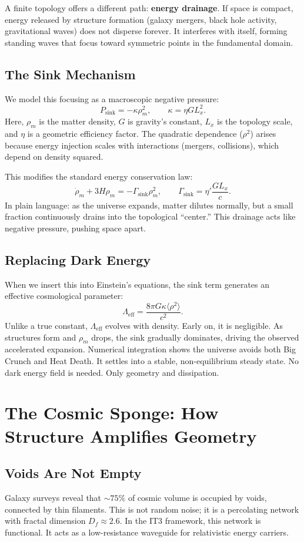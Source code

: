 \documentclass[12pt,a4paper]{report}
\begin{document}
A finite topology offers a different path: \textbf{energy drainage}. If space is compact, energy released by structure formation (galaxy mergers, black hole activity, gravitational waves) does not disperse forever. It interferes with itself, forming standing waves that focus toward symmetric points in the fundamental domain.

\section{The Sink Mechanism}
We model this focusing as a macroscopic negative pressure:
$$
P_{\text{sink}} = -\kappa \rho_m^2, \qquad \kappa = \eta G L_x^2.
$$
Here, $\rho_m$ is the matter density, $G$ is gravity's constant, $L_x$ is the topology scale, and $\eta$ is a geometric efficiency factor. The quadratic dependence ($\rho^2$) arises because energy injection scales with interactions (mergers, collisions), which depend on density squared.

This modifies the standard energy conservation law:
$$
\dot{\rho}_m + 3H\rho_m = -\Gamma_{\text{sink}}\rho_m^2, \qquad \Gamma_{\text{sink}} = \eta' \frac{G L_x}{c}.
$$
In plain language: as the universe expands, matter dilutes normally, but a small fraction continuously drains into the topological ``center.'' This drainage acts like negative pressure, pushing space apart.

\section{Replacing Dark Energy}
When we insert this into Einstein's equations, the sink term generates an effective cosmological parameter:
$$
\Lambda_{\text{eff}} = \frac{8\pi G \kappa \langle \rho^2 \rangle}{c^2}.
$$
Unlike a true constant, $\Lambda_{\text{eff}}$ evolves with density. Early on, it is negligible. As structures form and $\rho_m$ drops, the sink gradually dominates, driving the observed accelerated expansion. Numerical integration shows the universe avoids both Big Crunch and Heat Death. It settles into a stable, non-equilibrium steady state. No dark energy field is needed. Only geometry and dissipation.

\chapter{The Cosmic Sponge: How Structure Amplifies Geometry}
\section{Voids Are Not Empty}
Galaxy surveys reveal that $\sim 75\%$ of cosmic volume is occupied by voids, connected by thin filaments. This is not random noise; it is a percolating network with fractal dimension $D_f \approx 2.6$. In the IT3 framework, this network is functional. It acts as a low-resistance waveguide for relativistic energy carriers.
\end{document}
